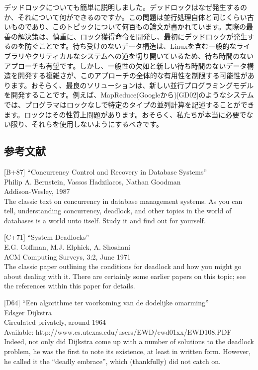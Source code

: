 デッドロックについても簡単に説明しました。デッドロックはなぜ発生するのか、それについて何ができるのですか。この問題は並行処理自体と同じくらい古いものであり、このトピックについて何百もの論文が書かれています。実際の最善の解決策は、慎重に、ロック獲得命令を開発し、最初にデッドロックが発生するのを防ぐことです。待ち受けのないデータ構造は、Linuxを含む一般的なライブラリやクリティカルなシステムへの道を切り開いているため、待ち時間のないアプローチも有望です。しかし、一般性の欠如と新しい待ち時間のないデータ構造を開発する複雑さが、このアプローチの全体的な有用性を制限する可能性があります。おそらく、最良のソリューションは、新しい並行プログラミングモデルを開発することです。例えば、MapReduce(Googleから){[}GD02{]}のようなシステムでは、プログラマはロックなしで特定のタイプの並列計算を記述することができます。ロックはその性質上問題があります。おそらく、私たちが本当に必要でない限り、それらを使用しないようにするべきです。

\hypertarget{ux53c2ux8003ux6587ux732e-21}{%
\subsection*{参考文献}\label{ux53c2ux8003ux6587ux732e-21}}

{[}B+87{]} ``Concurrency Control and Recovery in Database Systems''\\
Philip A. Bernstein, Vassos Hadzilacos, Nathan Goodman\\
Addison-Wesley, 1987\\
The classic text on concurrency in database management systems. As you
can tell, understanding concurrency, deadlock, and other topics in the
world of databases is a world unto itself. Study it and find out for
yourself.

{[}C+71{]} ``System Deadlocks''\\
E.G. Coffman, M.J. Elphick, A. Shoshani\\
ACM Computing Surveys, 3:2, June 1971\\
The classic paper outlining the conditions for deadlock and how you
might go about dealing with it. There are certainly some earlier papers
on this topic; see the references within this paper for details.

{[}D64{]} ``Een algorithme ter voorkoming van de dodelijke omarming''\\
Edsger Dijkstra\\
Circulated privately, around 1964\\
Available: http://www.cs.utexas.edu/users/EWD/ewd01xx/EWD108.PDF\\
Indeed, not only did Dijkstra come up with a number of solutions to the
deadlock problem, he was the first to note its existence, at least in
written form. However, he called it the ``deadly embrace'', which
(thankfully) did not catch on.

